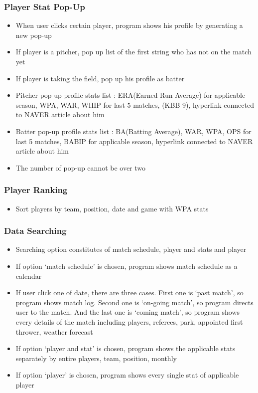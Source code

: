 \documentclass[conference,compsoc, twocolumn]{IEEEtran}
\begin{document}
\subsubsection{Player Stat Pop-Up}
\begin{itemize}
\item When user clicks certain player, program shows his profile by generating a new pop-up
\item If player is a pitcher, pop up list of the first string who has not on the match yet
\item If player is taking the field, pop up his profile as batter
\item Pitcher pop-up profile stats list : ERA(Earned Run Average) for applicable season, WPA, WAR, WHIP for last 5 matches, (K\/BB 9), hyperlink connected to NAVER article about him
\item Batter pop-up profile stats list : BA(Batting Average), WAR, WPA, OPS for last 5 matches, BABIP for applicable season, \quad hyperlink connected to NAVER article about him
\item The number of pop-up cannot be over two
\end{itemize}

\subsubsection{Player Ranking}
\begin{itemize}
\item Sort players by team, position, date and game with WPA stats
\end{itemize}

\subsubsection{Data Searching}
\begin{itemize}
\item Searching option constitutes of match schedule, player and stats and player
\item If option ‘match schedule’ is chosen, program shows match schedule as a calendar
\item If user click one of date, there are three cases. First one is ‘past match’, so program shows match log. Second one is ‘on-going match’, so program directs user to the match. And the last one is ‘coming match’, so program shows every details of  the match including players, referees, park,  appointed first thrower, weather forecast 
\item If option ‘player and stat’ is chosen, program shows the applicable stats separately by entire players,  team, position, monthly
\item If option ‘player’ is chosen, program shows every single stat of applicable player
\end{itemize}
\end{document}
